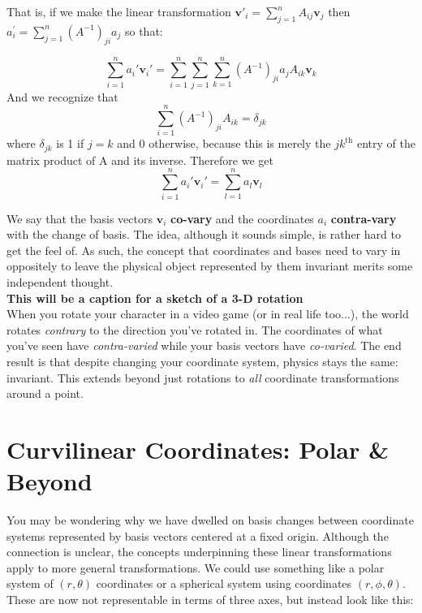 	That is, if we make the linear transformation $\mathbf v'_i = \sum_{j=1}^n A_{ij} \mathbf v_j$ then $a^\prime_i = \sum_{j=1}^n (A^{-1})_{ji} a_j$ so that:
	
	\begin{equation*}
		\sum_{i=1}^n a_i' \mathbf v_i' = \sum_{i=1}^n \sum_{j=1}^n\sum_{k=1}^n (A^{-1})_{ji} a_jA_{ik}\mathbf v_k
	\end{equation*}
	And we recognize that 
	\begin{equation*}
		\sum\limits_{i = 1}^n (A^{-1})_{ji} A_{ik} = \delta_{jk}
	\end{equation*}
	where $\delta_{jk}$ is 1 if $j = k$ and 0 otherwise, because this is merely the $jk^{\text{th}}$ entry of the matrix product of A and its inverse.  Therefore we get 
	\begin{equation*}
		\sum_{i=1}^n a_i' \mathbf v_i' =   \sum_{l=1}^n  a_l\mathbf v_l
	\end{equation*}
	 
We say that the basis vectors $\mathbf v_i$ \textbf{co-vary} and the coordinates $a_i$ \textbf{contra-vary} with the change of basis. The idea, although it sounds simple, is rather hard to get the feel of. As such, the concept that coordinates and bases need to vary in oppositely to leave the physical object represented by them invariant merits some independent thought.\\ 
	
	\textbf{This will be a caption for a sketch of a 3-D rotation}\\
	
	 When you rotate your character in a video game (or in real life too...), the world rotates \emph{contrary} to the direction you've rotated in. The coordinates of what you've seen have \emph{contra-varied} while your basis vectors have \emph{co-varied}. The end result is that despite changing your coordinate system, physics stays the same: invariant. This extends beyond just rotations to \emph{all} coordinate transformations around a point. 
	
	
	\section{Curvilinear Coordinates: Polar \& Beyond} %
	\label{sec:curvilinear_coordinates_polar_beyond}
	
	You may be wondering why we have dwelled on basis changes between coordinate systems represented by basis vectors centered at a fixed origin. Although the connection is unclear, the concepts underpinning these linear transformations apply to more general transformations.  We could use something like a polar system of $(r,\theta)$ coordinates or a spherical system using coordinates $(r, \phi, \theta)$. These are now not representable in terms of three axes, but instead look like this:\\
	
